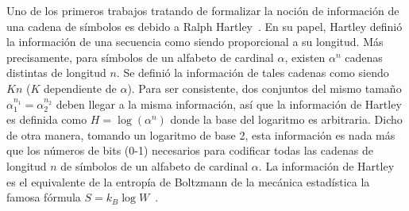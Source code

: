 \label{s:SZ:Entropia}


\label{sec:SZ:DefinicionShannon}

Uno de los primeros trabajos tratando de formalizar la noci\'on de informaci\'on
de  una cadena  de s\'imbolos  es debido  a Ralph  Hartley~\cite{Har28}.   En su
papel,  Hartley  defini\'o  la   informaci\'on  de  una  secuencia  como  siendo
proporcional a su longitud.  M\'as  precisamente, para s\'imbolos de un alfabeto
de cardinal $\alpha$,  existen $\alpha^n$ cadenas distintas de  longitud $n$. Se
defini\'o la informaci\'on  de tales cadenas como siendo  $K n$ ($K$ dependiente
de  $\alpha$).    Para  ser  consistente,  dos  conjuntos   del  mismo  tama\~no
$\alpha_1^{n_1} =  \alpha_2^{n_2}$ deben llegar a la  misma informaci\'on, as\'i
que  la informaci\'on  de  Hartley es  definida  como $H  = \log\left(  \alpha^n
\right)$  donde la  base del  logaritmo es  arbitraria.  Dicho  de  otra manera,
tomando  un logaritmo  de  base 2,  esta  informaci\'on es  nada  m\'as que  los
n\'umeros de bits (0-1) necesarios  para codificar todas las cadenas de longitud
$n$  de s\'imbolos de  un alfabeto  de cardinal  $\alpha$.  La  informaci\'on de
Hartley  es  el equivalente  de  la entrop\'ia  de  Boltzmann  de la  mec\'anica
estad\'istica la  famosa f\'ormula $S  = k_B \log W$~\cite{Bol96,  Bol98, Jay65,
  Mer10, Mer18}.

